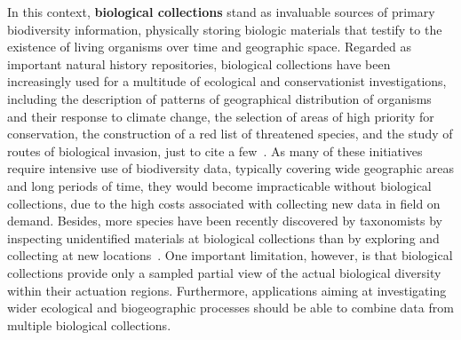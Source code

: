 In this context, \textbf{biological collections} stand as invaluable sources of primary biodiversity information, physically storing biologic materials that testify to the existence of living organisms over time and geographic space.
Regarded as important natural history repositories, biological collections have been increasingly used for a multitude of ecological and conservationist investigations, including the description of patterns of geographical distribution of organisms and their response to climate change, the selection of areas of high priority for conservation, the construction of a red list of threatened species, and the study of routes of biological invasion, just to cite a few~\cite{Pyke2010, Nualart2017,Kemp2015,Chapman2005b}. %
As many of these initiatives require intensive use of biodiversity data, typically covering wide geographic areas and long periods of time, they would become impracticable without biological collections, due to the high costs associated with collecting new data in field on demand.
Besides, more species have been recently discovered by taxonomists by inspecting unidentified materials at biological collections than by exploring and collecting at new locations~\cite{Kemp2015}.
%
One important limitation, however, is that biological collections provide only a sampled partial view of the actual biological diversity within their actuation regions. Furthermore, applications aiming at investigating wider ecological and biogeographic processes should be able to combine data from multiple biological collections.


